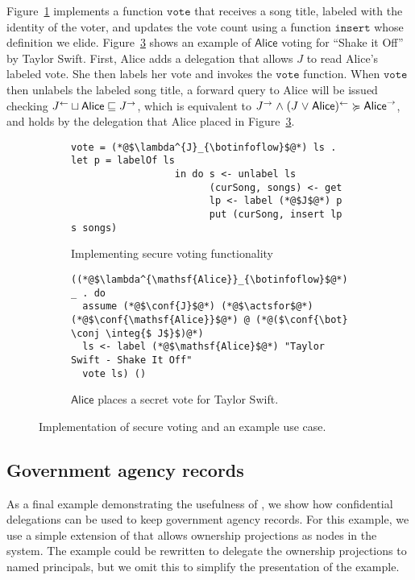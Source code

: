 Figure~\ref{fig:vote-for-song} implements a function $\mathtt{vote}$ that receives a song title, labeled with the identity of the voter, and updates the vote count using a function $\mathtt{insert}$ whose definition we elide. Figure~\ref{fig:jukebox-alice-votes-for-taylor-swift} shows an example of $\mathsf{Alice}$ voting for ``Shake it Off'' by Taylor Swift. First, Alice adds a delegation that allows $J$ to read Alice's labeled vote. She then labels her vote and invokes the $\mathtt{vote}$ function. When $\mathtt{vote}$ then unlabels the labeled song title, a forward query to Alice will be issued checking $J^{\leftarrow} \sqcup \mathsf{Alice} \sqsubseteq J^{\rightarrow}$, which is equivalent to $J^{\rightarrow} \mathrel{\land} (J \mathrel{\lor} \mathsf{Alice})^{\leftarrow} \succcurlyeq \mathsf{Alice}^{\rightarrow}$, and holds by the delegation that Alice placed in Figure~\ref{fig:jukebox-alice-votes-for-taylor-swift}.

\begin{figure}
\centering
\begin{subfigure}{0.5\textwidth}
\begin{lstlisting}
vote = (*@$\lambda^{J}_{\botinfoflow}$@*) ls . let p = labelOf ls
                  in do s <- unlabel ls
                        (curSong, songs) <- get
                        lp <- label (*@$J$@*) p
                        put (curSong, insert lp s songs)
\end{lstlisting}
\caption{Implementing secure voting functionality}
\label{fig:vote-for-song}
\end{subfigure}
\begin{subfigure}{0.5\textwidth}
\begin{lstlisting}
((*@$\lambda^{\mathsf{Alice}}_{\botinfoflow}$@*) _ . do
  assume (*@$\conf{J}$@*) (*@$\actsfor$@*) (*@$\conf{\mathsf{Alice}}$@*) @ (*@($\conf{\bot} \conj \integ{$ J$}$)@*)
  ls <- label (*@$\mathsf{Alice}$@*) "Taylor Swift - Shake It Off"
  vote ls) ()
\end{lstlisting}
\caption{$\mathsf{Alice}$ places a secret vote for Taylor Swift.}
\label{fig:jukebox-alice-votes-for-taylor-swift}
\end{subfigure}
\caption{Implementation of secure voting and an example use case.}
\end{figure}

\subsection{Government agency records}\label{subsec:agents}
As a final example demonstrating the usefulness of \lang, we show how confidential delegations can be used to keep government agency records. For this example, we use a simple extension of \lang{} that allows ownership projections as nodes in the system. The example could be rewritten to delegate the ownership projections to named principals, but we omit this to simplify the presentation of the example.

